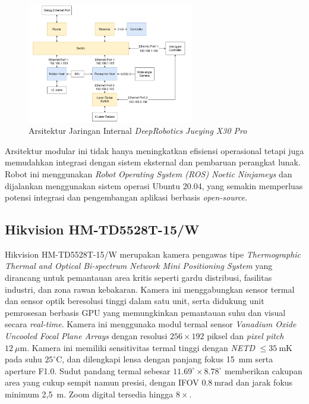 \begin{figure}[H]
  \centering
  \includegraphics[width=0.65\textwidth]{gambar/bab2/network-x30.png}
  \caption{Arsitektur Jaringan Internal \emph{DeepRobotics Jueying X30 Pro}}
  \label{fig:network_architecture_x30pro}
\end{figure}


Arsitektur modular ini tidak hanya meningkatkan efisiensi operasional tetapi juga memudahkan integrasi dengan sistem eksternal dan pembaruan perangkat lunak. Robot ini menggunakan \emph{Robot Operating System (ROS) Noetic Ninjameys} dan dijalankan menggunakan sistem operasi Ubuntu 20.04, yang semakin memperluas potensi integrasi dan pengembangan aplikasi berbasis \emph{open-source}.


\subsection{Hikvision HM-TD5528T-15/W}
Hikvision HM-TD5528T-15/W merupakan kamera pengawas tipe \emph{Thermographic Thermal and Optical Bi-spectrum Network Mini Positioning System} yang dirancang untuk pemantauan area kritis seperti gardu distribusi, fasilitas industri, dan zona rawan kebakaran. Kamera ini menggabungkan sensor termal dan sensor optik beresolusi tinggi dalam satu unit, serta didukung unit pemrosesan berbasis GPU yang memungkinkan pemantauan suhu dan visual secara \emph{real-time}. Kamera ini menggunaka modul termal sensor \emph{Vanadium Oxide Uncooled Focal Plane Arrays} dengan resolusi \(256 \times 192\) piksel dan \emph{pixel pitch} \(12~\mu\text{m}\). Kamera ini memiliki sensitivitas termal tinggi dengan \emph{NETD} \(\leq 35~\text{mK}\) pada suhu \(25^\circ\text{C}\), dan dilengkapi lensa dengan panjang fokus 15~mm serta aperture F1.0. Sudut pandang termal sebesar \(11.69^\circ \times 8.78^\circ\) memberikan cakupan area yang cukup sempit namun presisi, dengan IFOV \(0.8~\text{mrad}\) dan jarak fokus minimum 2{,}5~m. Zoom digital tersedia hingga \(8 \times\).

